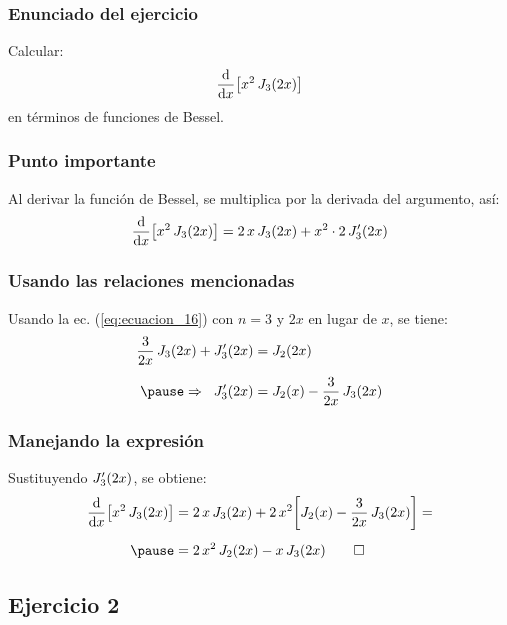 \documentclass[12pt]{beamer}
\begin{document}
\begin{frame}
\frametitle{Enunciado del ejercicio}
Calcular:
\begin{align*}
\dv{x} \big[ x^{2} \, J_{3}(2 x) \big]
\end{align*}
en términos de funciones de Bessel.
\end{frame}
\begin{frame}
\frametitle{Punto importante}
Al derivar la función de Bessel, se multiplica por la derivada del argumento, así:
\pause
\begin{align*}
\dv{x} \big[ x^{2} \, J_{3}(2 x) \big] = 2 \, x \, J_{3} (2 x) + x^{2} \cdot 2 \, {J}^{\prime}_{3} (2 x)
\end{align*}
\end{frame}
\begin{frame}
\frametitle{Usando las relaciones mencionadas}
Usando la ec. (\ref{eq:ecuacion_16}) con $n = 3$ y $2 x$ en lugar de $x$, se tiene:
\pause
\begin{eqnarray*}
\begin{aligned}
\dfrac{3}{2 x} \, J_{3}(2 x) + \pderivada{J}_{3}(2 x) &= J_{2} (2 x) \\[0.5em] \pause
\Rightarrow \hspace{0.2cm} \pderivada{J}_{3} (2 x) &= J_{2}(x) - \dfrac{3}{2 x} \, J_{3} (2 x)
\end{aligned}
\end{eqnarray*}
\end{frame}
\begin{frame}
\frametitle{Manejando la expresión}
Sustituyendo ${J}^{\prime}_{3}(2 x)$, se obtiene:
\pause
\begin{eqnarray*}
\begin{aligned}
\dv{x} \big[ x^{2} \, J_{3}(2 x) \big] &=  2 \, x \, J_{3} (2 x) + 2 \, x^{2} \bigg[ J_{2}(x) - \dfrac{3}{2 x} \, J_{3} (2 x) \bigg] = \\[0.5em] \pause
 &= 2 \, x^{2} \, J_{2} (2 x) - x \, J_{3} (2 x) \qed
\end{aligned}
\end{eqnarray*}
\end{frame}

\subsection{Ejercicio 2}
\end{document}
